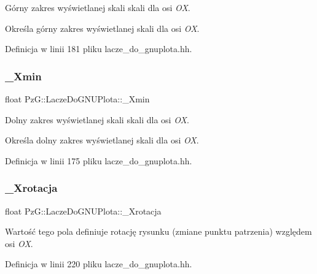 Górny zakres wyświetlanej skali skali dla osi {\itshape OX}. 

Określa górny zakres wyświetlanej skali dla osi {\itshape OX}. 

Definicja w linii 181 pliku lacze\+\_\+do\+\_\+gnuplota.\+hh.

\mbox{\label{class_pz_g_1_1_lacze_do_g_n_u_plota_a69d530edfe769e38448972e897456deb}} 
\subsubsection{\texorpdfstring{\+\_\+\+Xmin}{\_Xmin}}
{\footnotesize\ttfamily float Pz\+G\+::\+Lacze\+Do\+G\+N\+U\+Plota\+::\+\_\+\+Xmin\hspace{0.3cm}{\ttfamily [protected]}}



Dolny zakres wyświetlanej skali skali dla osi {\itshape OX}. 

Określa dolny zakres wyświetlanej skali dla osi {\itshape OX}. 

Definicja w linii 175 pliku lacze\+\_\+do\+\_\+gnuplota.\+hh.

\mbox{\label{class_pz_g_1_1_lacze_do_g_n_u_plota_a21e77f0a2bfb7fed989b6dc2d64b5a7e}} 
\subsubsection{\texorpdfstring{\+\_\+\+Xrotacja}{\_Xrotacja}}
{\footnotesize\ttfamily float Pz\+G\+::\+Lacze\+Do\+G\+N\+U\+Plota\+::\+\_\+\+Xrotacja\hspace{0.3cm}{\ttfamily [protected]}}

Wartość tego pola definiuje rotację rysunku (zmiane punktu patrzenia) względem osi {\itshape OX}. 

Definicja w linii 220 pliku lacze\+\_\+do\+\_\+gnuplota.\+hh.

\mbox{\label{class_pz_g_1_1_lacze_do_g_n_u_plota_a2c9303c4dbb4c9f0ddc4f1fe02eb3f70}} 

